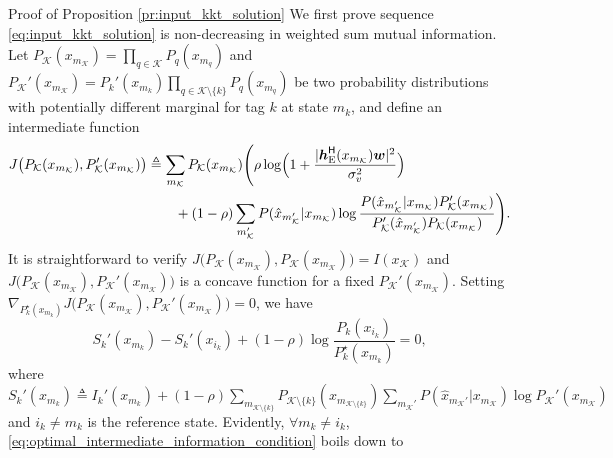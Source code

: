 \documentclass[journal,12pt,onecolumn,draftclsnofoot]{IEEEtran}
\theoremstyle{remark}
\begin{document}
\begin{appendix}
	\begin{subsection}{Proof of Proposition \ref{pr:input_kkt_solution}}
		We first prove sequence \eqref{eq:input_kkt_solution} is non-decreasing in weighted sum mutual information.
		Let $P_{\mathcal{K}}(x_{m_{\mathcal{K}}}) = \prod_{q \in \mathcal{K}} P_q(x_{m_q})$ and $P_{\mathcal{K}}'(x_{m_{\mathcal{K}}}) = P_k'(x_{m_k}) \prod_{q \in \mathcal{K} \setminus \{k\}} P_q(x_{m_q})$ be two probability distributions with potentially different marginal for tag $k$ at state $m_k$, and define an intermediate function
		\begin{align}
			J \bigl( P_{\mathcal{K}}(x_{m_{\mathcal{K}}}),P_{\mathcal{K}}'(x_{m_{\mathcal{K}}}) \bigr)
			 & \triangleq \sum_{m_{\mathcal{K}}} P_{\mathcal{K}}(x_{m_{\mathcal{K}}})
			\Biggl( \rho \log \Bigl(1 + \frac{\lvert \boldsymbol{h}_{\text{E}}^\mathsf{H}(x_{m_{\mathcal{K}}}) \boldsymbol{w} \rvert^2}{\sigma_v^2}\Bigr) \nonumber                                                                                                                                          \\
			 & \qquad + (1 - \rho) \sum_{m_{\mathcal{K}}'} P(\hat{x}_{m_{\mathcal{K}}'}|x_{m_{\mathcal{K}}}) \log \frac{P(\hat{x}_{m_{\mathcal{K}}'}|x_{m_{\mathcal{K}}}) P_{\mathcal{K}}'(x_{m_{\mathcal{K}}})}{P_{\mathcal{K}}'(\hat{x}_{m_{\mathcal{K}}'}) P_{\mathcal{K}}(x_{m_{\mathcal{K}}})} \Biggr).
			\label{eq:intermediate_information_function}
		\end{align}
		It is straightforward to verify $J \bigl( P_{\mathcal{K}}(x_{m_{\mathcal{K}}}),P_{\mathcal{K}}(x_{m_{\mathcal{K}}}) \bigr) = I(x_{\mathcal{K}})$ and $J \bigl( P_{\mathcal{K}}(x_{m_{\mathcal{K}}}),P_{\mathcal{K}}'(x_{m_{\mathcal{K}}}) \bigr)$ is a concave function for a fixed $P_{\mathcal{K}}'(x_{m_{\mathcal{K}}})$.
		Setting $\nabla_{P_k^\star(x_{m_k})} J \bigl( P_{\mathcal{K}}(x_{m_{\mathcal{K}}}),P_{\mathcal{K}}'(x_{m_{\mathcal{K}}}) \bigr) = 0$, we have
		\begin{equation}
			S_k'(x_{m_k}) - S_k'(x_{i_k}) + (1 - \rho) \log \frac{P_k(x_{i_k})}{P_k^\star(x_{m_k})} = 0,
			\label{eq:optimal_intermediate_information_condition}
		\end{equation}
		where $S_k'(x_{m_k}) \triangleq I_k'(x_{m_k}) + (1 - \rho) \sum_{m_{\mathcal{K} \setminus \{k\}}} P_{\mathcal{K} \setminus \{k\}}(x_{m_{\mathcal{K} \setminus \{k\}}}) \sum_{m_{\mathcal{K}}'} P(\hat{x}_{m_{\mathcal{K}}'}|x_{m_{\mathcal{K}}}) \log P_{\mathcal{K}}'(x_{m_{\mathcal{K}}})$ and $i_k \ne m_k$ is the reference state.
		Evidently, $\forall m_k \ne i_k$, \eqref{eq:optimal_intermediate_information_condition} boils down to

\end{subsection}
\end{appendix}
\end{document}
